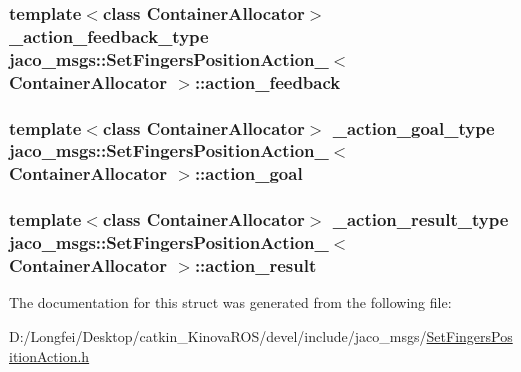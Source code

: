 \subsubsection[{\texorpdfstring{action\+\_\+feedback}{action_feedback}}]{\setlength{\rightskip}{0pt plus 5cm}template$<$class Container\+Allocator$>$ {\bf \+\_\+action\+\_\+feedback\+\_\+type} {\bf jaco\+\_\+msgs\+::\+Set\+Fingers\+Position\+Action\+\_\+}$<$ Container\+Allocator $>$\+::action\+\_\+feedback}\hypertarget{structjaco__msgs_1_1SetFingersPositionAction___a63d4e32eae92c1eb8284813b5c6e8323}{}\label{structjaco__msgs_1_1SetFingersPositionAction___a63d4e32eae92c1eb8284813b5c6e8323}
\subsubsection[{\texorpdfstring{action\+\_\+goal}{action_goal}}]{\setlength{\rightskip}{0pt plus 5cm}template$<$class Container\+Allocator$>$ {\bf \+\_\+action\+\_\+goal\+\_\+type} {\bf jaco\+\_\+msgs\+::\+Set\+Fingers\+Position\+Action\+\_\+}$<$ Container\+Allocator $>$\+::action\+\_\+goal}\hypertarget{structjaco__msgs_1_1SetFingersPositionAction___a35a5e82537b8fceaae4c0eef45b1e572}{}\label{structjaco__msgs_1_1SetFingersPositionAction___a35a5e82537b8fceaae4c0eef45b1e572}
\subsubsection[{\texorpdfstring{action\+\_\+result}{action_result}}]{\setlength{\rightskip}{0pt plus 5cm}template$<$class Container\+Allocator$>$ {\bf \+\_\+action\+\_\+result\+\_\+type} {\bf jaco\+\_\+msgs\+::\+Set\+Fingers\+Position\+Action\+\_\+}$<$ Container\+Allocator $>$\+::action\+\_\+result}\hypertarget{structjaco__msgs_1_1SetFingersPositionAction___addb918b75ecf45c25c778e6621200058}{}\label{structjaco__msgs_1_1SetFingersPositionAction___addb918b75ecf45c25c778e6621200058}


The documentation for this struct was generated from the following file\+:\begin{DoxyCompactItemize}
\item 
D\+:/\+Longfei/\+Desktop/catkin\+\_\+\+Kinova\+R\+O\+S/devel/include/jaco\+\_\+msgs/\hyperlink{SetFingersPositionAction_8h}{Set\+Fingers\+Position\+Action.\+h}\end{DoxyCompactItemize}
